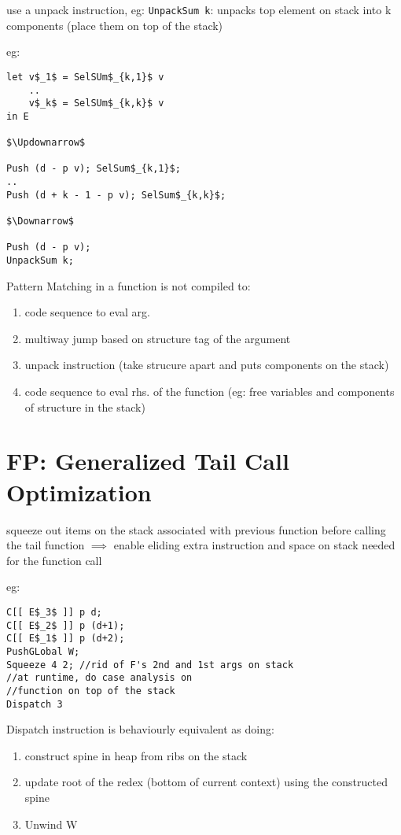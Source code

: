 \documentclass[8pt]{extarticle}
\begin{document}
\begin{multicols*}{2}
use a unpack instruction, eg: \verb|UnpackSum k|: unpacks top element on stack into k components (place them on top of the stack)

eg:

\begin{lstlisting}
let v$_1$ = SelSUm$_{k,1}$ v
    ..
    v$_k$ = SelSUm$_{k,k}$ v
in E

$\Updownarrow$

Push (d - p v); SelSum$_{k,1}$;
..
Push (d + k - 1 - p v); SelSum$_{k,k}$;

$\Downarrow$

Push (d - p v);
UnpackSum k;
\end{lstlisting}

Pattern Matching in a function is not compiled to:
\begin{enumerate}
\item code sequence to eval arg.
\item multiway jump based on structure tag of the argument
\item unpack instruction (take strucure apart and puts components on the stack)
\item code sequence to eval rhs. of the function (eg: free variables and components of structure in the stack)
\end{enumerate}

\vfill\null
\columnbreak

\section{FP: Generalized Tail Call Optimization}

squeeze out items on the stack associated with previous function before calling the tail function $\implies$ enable eliding extra instruction and space on stack needed for the function call

eg:

\begin{lstlisting}
C[[ E$_3$ ]] p d;
C[[ E$_2$ ]] p (d+1);
C[[ E$_1$ ]] p (d+2);
PushGLobal W;
Squeeze 4 2; //rid of F's 2nd and 1st args on stack
//at runtime, do case analysis on
//function on top of the stack
Dispatch 3 
\end{lstlisting}

Dispatch instruction is behaviourly equivalent as doing:
\begin{enumerate}
\item construct spine in heap from ribs on the stack
\item update root of the redex (bottom of current context) using the constructed spine
\item Unwind W
\end{enumerate}


\end{multicols*}
\end{document}

